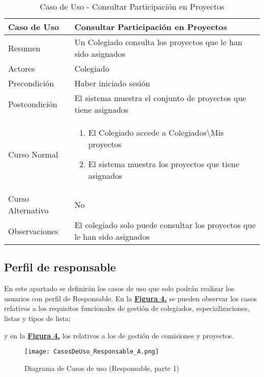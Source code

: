 \begin{table}[!htbp]
  \centering  \addtocounter{casouso}{1}
  \begin{tabular}{|l | p{100mm}|}
    \textbf{Caso de Uso}  & \textbf{Consultar Participación en Proyectos} \\ \hline
    Resumen 		 & Un Colegiado consulta los proyectos que le han sido asignados \\ \hline
    Actores  		 & Colegiado \\ \hline
    Precondición  	 & Haber iniciado sesión \\ \hline
    Postcondición  	 & El sistema muestra el conjunto de proyectos que tiene asignados \\ \hline
    Curso Normal   	 & \begin{enumerate}
	  \item El Colegiado accede a Colegiados\textbackslash Mis proyectos
	  \item El sistema muestra los proyectos que tiene asignados
    \end{enumerate}  \\ \hline
    Curso Alternativo  & No  \\ \hline
    Observaciones 	 & El colegiado solo puede consultar los proyectos que le han sido asignados \\ \hline
  \end{tabular}
  \caption{Caso de Uso  - Consultar Participación en Proyectos}
  \label{tab:cucConsultaProyectos}
\end{table}
\FloatBarrier


\subsection{Perfil de responsable}

\addtocounter{figura_cap4}{1}
En este apartado se definirán los casos de uso que solo podrán realizar los usuarios con perfil de Responsable. En la \textbf{\hyperref[fig:CasosDeUso_Responsable_A]{Figura 4.}} se pueden observar los casos relativos a los requisitos funcionales de gestión de colegiados, especializaciones, listas y tipos de lista;\addtocounter{figura_cap4}{1} y en la \textbf{\hyperref[fig:CasosDeUso_Responsable_B]{Figura 4.}} los relativos a los de gestión de comisiones y proyectos.

\begin{figure}[!htbp]
  \centering
  \texttt{[image: CasosDeUso\_Responsable\_A.png]}
  \caption{Diagrama de Casos de uso (Responsable, parte 1)}
  \label{fig:CasosDeUso_Responsable_A}
\end{figure}
\FloatBarrier

